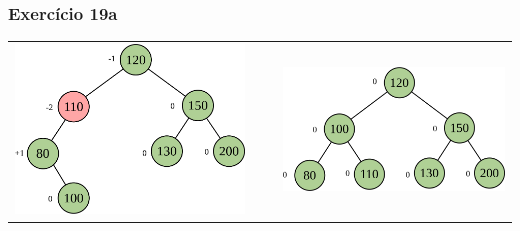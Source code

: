 \documentclass[aspectratio=169]{beamer}
\begin{document}
\begin{frame}[fragile]\frametitle{Exercício 19a}
\begin{tabular}{lll}
\includegraphics[height=0.45\paperheight]{imagens/avl17c.png} & ~ ~ &
\includegraphics[height=0.33\paperheight]{imagens/avl17d.png} \\
\end{tabular}
\end{frame}
\end{document}
